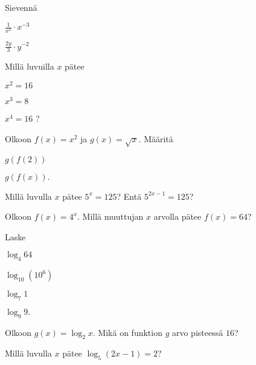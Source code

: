 \begin{tehtava}
Sievennä
\begin{kohdat}
\item \(\displaystyle \frac{1}{x^2} \cdot x^{-3}\)
\item \(\displaystyle \frac{2y}{3} \cdot y^{-2}\)
\end{kohdat}
\end{tehtava}

\begin{tehtava}
Millä luvuilla $x$ pätee
\begin{kohdat}
\item \(x^2 = 16\)
\item \(x^3 = 8\)
\item \(x^4 = 16\) ?
\end{kohdat}
\end{tehtava}

\begin{tehtava}
Olkoon $f(x) = x^2$ ja $g(x)= \sqrt{x}$. Määritä
\begin{kohdat}
\item \(g(f(2))\)
\item \(g(f(x)).\)
\end{kohdat}
\end{tehtava}

\begin{tehtava}
Millä luvulla $x$ pätee $5^{x} = 125$? Entä $5^{2x-1} = 125$?
\end{tehtava}

\begin{tehtava}
Olkoon $f(x) = 4^x$. Millä muuttujan $x$ arvolla pätee $f(x)=64$?
\end{tehtava}

\begin{tehtava}
Laske
\begin{kohdat}
\item \(\log_4 64\)
\item \(\log_{10} (10^6)\)
\item \(\log_7 1\)
\item \(\log_9 9.\)
\end{kohdat}
\end{tehtava}

\begin{tehtava}
Olkoon $g(x) = \log_2 x$. Mikä on funktion $g$ arvo pisteessä $16$?
\end{tehtava}

\begin{tehtava}
Millä luvulla $x$ pätee $\log_5 (2x-1) = 2$?
\end{tehtava}

